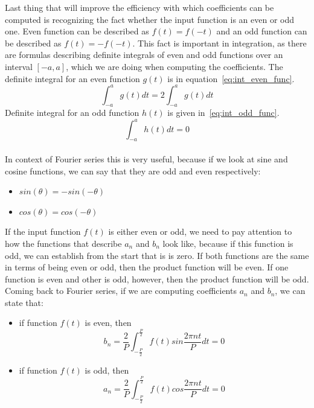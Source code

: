 \documentclass[titlepage]{article}
\begin{document}
    Last thing that will improve the efficiency with which coefficients can be
    computed is recognizing the fact whether the input function is an even or odd
    one. Even function can be described as $f(t) = f(-t)$ and an odd function can
    be described as $f(t) = -f(-t)$. This fact is important in integration, as there
    are formulas describing definite integrals of even and odd functions over an
    interval $[-a,a]$, which we are doing when computing the coefficients. The 
    definite integral for an even function $g(t)$ is in equation~\eqref{eq:int_even_func}.
    \begin{equation}\label{eq:int_even_func}
        \int_{-a}^{a}g(t)dt = 2\int_{-a}^{a}g(t)dt
    \end{equation}
    Definite integral for an odd function $h(t)$ is given in~\eqref{eq:int_odd_func}.
    \begin{equation}\label{eq:int_odd_func}
        \int_{-a}^{a}h(t)dt = 0
    \end{equation} 
    \\
    In context of Fourier series this is very useful, because if we look at sine
    and cosine functions, we can say that they are odd and even respectively:
    \begin{itemize}
        \item $sin(\theta) = -sin(-\theta)$
        \item $cos(\theta) = cos(-\theta)$ 
    \end{itemize}
    If the input
    function $f(t)$ is either even or odd, we need to pay attention to how
    the functions that describe $a_n$ and $b_n$ look like, because if this function
    is odd, we can establish from the start that is is zero. If both functions
    are the same in terms of being even or odd, then the product function will
    be even. If one function is even and other is odd, however, then the product
    function will be odd. Coming back to Fourier series, if we are computing 
    coefficients $a_n$ and $b_n$, we can state that:
    \begin{itemize}
        \item if function $f(t)$ is even, then
            \begin{equation*}
                b_n = \frac{2}{P}\int_{-\frac{P}{2}}^{\frac{P}{2}}f(t)sin\frac{2\pi nt}{P}dt = 0
            \end{equation*}
        \item if function $f(t)$ is odd, then
            \begin{equation*}
                a_n = \frac{2}{P}\int_{-\frac{P}{2}}^{\frac{P}{2}}f(t)cos\frac{2\pi nt}{P}dt = 0
            \end{equation*}
        \end{itemize}
\end{document}
